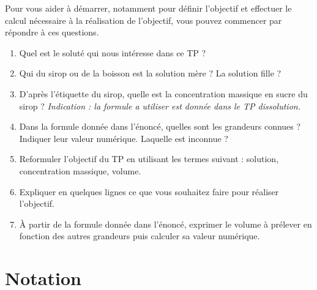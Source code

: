 Pour vous aider à démarrer, notamment pour définir l'objectif et effectuer le calcul nécessaire à la réalisation de l'objectif, vous pouvez commencer par répondre à ces questions.
\begin{enumerate}
\item Quel est le soluté qui nous intéresse dans ce TP ?
\item Qui du sirop ou de la boisson est la solution mère ?
La solution fille ?
\item D'après l'étiquette du sirop, quelle est la concentration massique en sucre du sirop ?
\emph{Indication : la formule a utiliser est donnée dans le TP dissolution.}
\item Dans la formule donnée dans l'énoncé, quelles sont les grandeurs connues ?
Indiquer leur valeur numérique.
Laquelle est inconnue ?
\item Reformuler l'objectif du TP en utilisant les termes suivant : solution, concentration massique, volume.
\item Expliquer en quelques lignes ce que vous souhaitez faire pour réaliser l'objectif.
\item À partir de la formule donnée dans l'énoncé, exprimer le volume à prélever en fonction des autres grandeurs puis calculer sa valeur numérique.
\end{enumerate}

\section*{Notation}


